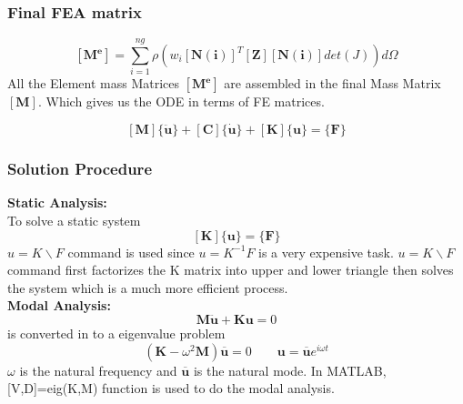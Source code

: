 \documentclass[9pt]{beamer}
\begin{document}
\begin{frame}
\frametitle{Final FEA matrix}
\begin{equation*}
\left[ \mathbf{M^e}  \right] 
=
\sum_{i = 1}^{ng}
\rho\left(w_i
\left[ \mathbf{N(i)}  \right]^T
\left[ \mathbf{Z}  \right]
\left[ \mathbf{N(i)}  \right] 
det(J)\right)  d \Omega
\end{equation*}
All the Element mass Matrices $\left[ \mathbf{M^e}  \right]$ are assembled in the final Mass Matrix $\left[ \mathbf{M} \right]$. Which gives us the  ODE in terms of FE matrices.

\begin{equation*}
\left[ \mathbf{M}  \right] 
\{ \ddot{\mathbf{u}} \}
+
\left[ \mathbf{C}  \right] 
\{ \dot{\mathbf{u}} \}
+
\left[ \mathbf{K}  \right] 
\{\mathbf{u} \}
=
\{ \mathbf{F} \}
\end{equation*}
\end{frame}


\begin{frame}
\frametitle{Solution Procedure}
\textbf{Static Analysis:}\\

To solve a static system  
\begin{equation*}
 \left[ \mathbf{K}  \right] 
\{\mathbf{u} \}
=
\{ \mathbf{F} \} 
\end{equation*}
 $ u=K \backslash F $ command is used since $u=K^{-1}F$ is a very expensive task. $u=K \backslash F$ command first factorizes the K matrix into upper and lower triangle then solves the system which is a much more efficient process.
\\
\textbf{Modal Analysis:}\\


\begin{equation*}
\mathbf{M}\mathbf{\ddot{{ u}}}+\mathbf{K}\mathbf{{ u}}=0
\end{equation*}
is converted in to a eigenvalue  problem
\begin{equation*}
\left( \mathbf{K} - \omega^2 \mathbf{M}  \right) \overline{\mathbf{u} } = 0 \qquad { \mathbf{u}}=\overline{ \mathbf{u}}e^{i\omega t}
\end{equation*}
$\omega$ is the natural frequency and $\overline{\mathbf{u}}$ is the natural mode. In MATLAB, [V,D]=eig(K,M) function is used to do the modal analysis.
\end{frame}
\end{document}
